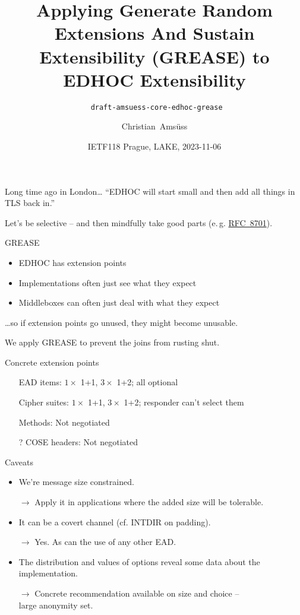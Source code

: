 \documentclass[aspectratio=169,colorlinks]{beamer}
\title[Applying GREASE to EDHOC]{Applying Generate Random Extensions And Sustain Extensibility (GREASE) to EDHOC Extensibility}
\subtitle{\texttt{ draft-amsuess-core-edhoc-grease}}
\author{Christian~Amsüss}
\date{IETF118 Prague, LAKE, 2023-11-06}
\newcommand{\rfc}[1]{\href{https://datatracker.ietf.org/doc/html/rfc#1}{RFC~#1}}
\begin{document}
\frame{\titlepage}

\begin{frame}{Long time ago in London\ldots}\Large
  ``EDHOC will start small and then add all things in TLS back in.''

  \bigskip

  Let's be selective -- and then mindfully take good parts (e.\,g. \rfc{8701}).
\end{frame}

\begin{frame}{GREASE}\Large
  \begin{itemize}
    \item EDHOC has extension points
    \item Implementations often just see what they expect
    \item Middleboxes can often just deal with what they expect
  \end{itemize}

  \bigskip

  \ldots so if extension points go unused, they might become unusable.

  \bigskip

  We apply GREASE to prevent the joins from rusting shut.
\end{frame}

\begin{frame}{Concrete extension points}\Large
  \begin{itemize}
    \item[\ding{52}] EAD items: $1\times$ 1+1, $3\times$ 1+2; all optional
    \item[\ding{52}] Cipher suites: $1\times$ 1+1, $3\times$ 1+2; responder can't select them
    \item[\ding{56}] Methods: Not negotiated
    \item[?] COSE headers: Not negotiated %
  \end{itemize}
\end{frame}

\begin{frame}{Caveats}\Large
  \begin{itemize}
    \item We're message size constrained.

      $\to$ Apply it in applications where the added size will be tolerable.

    \item It can be a covert channel (cf. INTDIR on padding).

      $\to$ Yes. As can the use of any other EAD.

    \item The distribution and values of options reveal some data about the implementation.

      $\to$ Concrete recommendation available on size and choice -- \\large anonymity set.
  \end{itemize}
\end{frame}
\end{document}
